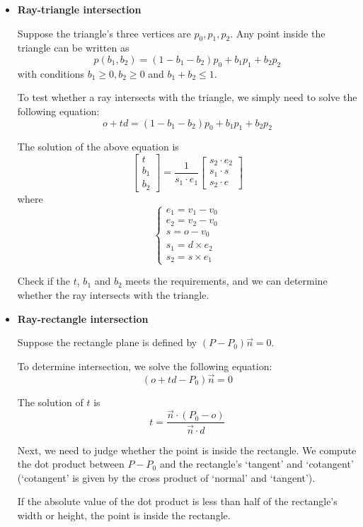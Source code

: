 \documentclass[acmtog]{acmart}
\begin{document}
\begin{itemize}
	\item \textbf{Ray-triangle intersection}
	
	Suppose the triangle's three vertices are $p_0, p_1, p_2$. Any point inside the triangle can be written as \[
		p(b_1, b_2) = (1-b_1-b_2) p_0 + b_1 p_1 + b_2 p_2	
	\] with conditions $b_1 \geq 0, b_2 \geq 0$ and $b_1 + b_2 \leq 1$.

	To test whether a ray intersects with the triangle, we simply need to solve the following equation: \[
		o + td = (1-b_1-b_2) p_0 + b_1 p_1 + b_2 p_2	
	\]

	The solution of the above equation is \[
		\begin{bmatrix}
			t \\ b_1 \\ b_2
		\end{bmatrix} 
		= 
		\frac{1}{s_1 \cdot e_1}
		\begin{bmatrix}
			s_2 \cdot e_2\\
			s_1 \cdot s\\
			s_2 \cdot e
		\end{bmatrix}
	\] where \[
		\begin{cases}
			e_1 = v_1 - v_0 \\
			e_2 = v_2 - v_0 \\
			s = o - v_0 \\
			s_1 = d \times e_2 \\
			s_2 = s \times e_1
		\end{cases}
	\]

	Check if the $t$, $b_1$ and $b_2$ meets the requirements, and we can determine whether the ray intersects with the triangle.

	\item \textbf{Ray-rectangle intersection}
	
	Suppose the rectangle plane is defined by $(P - P_0)\overrightarrow{n} = 0$.

	To determine intersection, we solve the following equation: \[
		(o + td - P_0) \overrightarrow{n} = 0
	\]

	The solution of $t$ is 
	\[
		t = \frac{\overrightarrow{n} \cdot (P_0 - o)}{\overrightarrow{n} \cdot d}
	\]

	Next, we need to judge whether the point is inside the rectangle. We compute the dot product between $P-P_0$ and the rectangle's `tangent' and `cotangent' (`cotangent' is given by the cross product of `normal' and `tangent'). 

	If the absolute value of the dot product is less than half of the rectangle's width or height, the point is inside the rectangle.



\end{itemize}
\end{document}
